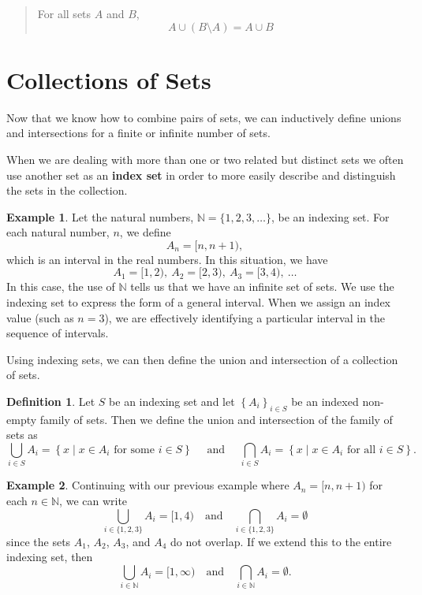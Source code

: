 \documentclass[
]{book}
\theoremstyle{definition}
\newtheorem{definition}{Definition}[chapter]
\theoremstyle{definition}
\newtheorem{example}{Example}[chapter]
\theoremstyle{definition}
\theoremstyle{remark}
\begin{document}
\begin{quote}
For all sets \(A\) and \(B\), \[A \cup (B\setminus A)= A \cup B\]
\end{quote}

\hypertarget{collections-of-sets}{%
\section{Collections of Sets}\label{collections-of-sets}}

Now that we know how to combine pairs of sets, we can inductively define unions and intersections for a finite or infinite number of sets.

When we are dealing with more than one or two related but distinct sets we often use another set as an \textbf{index set} in order to more easily describe and distinguish the sets in the collection.

\begin{example}
\protect\hypertarget{exm:unnamed-chunk-29}{}{\label{exm:unnamed-chunk-29} }Let the natural numbers, \(\mathbb{N}=\{1, 2, 3, \ldots \}\), be an indexing set. For each natural number, \(n\), we define \[A_n = [n,n+1),\] which is an interval in the real numbers. In this situation, we have
\[A_1 = [1,2), \:  A_2 = [2,3), \: A_3 = [3,4),\:  \ldots \]
In this case, the use of \(\mathbb{N}\) tells us that we have an infinite set of sets. We use the indexing set to express the form of a general interval. When we assign an index value (such as \(n=3\)), we are effectively identifying a particular interval in the sequence of intervals.
\end{example}

Using indexing sets, we can then define the union and intersection of a collection of sets.

\begin{definition}
\protect\hypertarget{def:unnamed-chunk-30}{}{\label{def:unnamed-chunk-30} } Let \(S\) be an indexing set and let \(\left\{ A_i\right\}_{i\in S}\) be an indexed non-empty family of sets. Then we define the union and intersection of the family of sets as
\[\bigcup_{i\in S} A_i = \left\{ x \middle \vert x\in A_i \mbox{ for some } i\in S\right\} \quad \mbox{ and } \quad \bigcap_{i\in S} A_i = \left\{ x\middle \vert x\in A_i \mbox{ for all } i \in S\right\}.\]
\end{definition}

\begin{example}
\protect\hypertarget{exm:disjoint}{}{\label{exm:disjoint} }Continuing with our previous example where \(A_n= [n,n+1)\) for each \(n\in \mathbb{N}\), we can write
\[ \bigcup_{i\in \{1,2,3\}} A_i = [1,4) \quad \mbox{and} \quad \bigcap_{i\in \{1,2,3\}} A_i = \emptyset\]
since the sets \(A_1\), \(A_2\), \(A_3\), and \(A_4\) do not overlap. If we extend this to the entire indexing set, then \[\bigcup_{i\in \mathbb{N}} A_i = [1,\infty) \quad \mbox{and} \quad \bigcap_{i\in \mathbb{N}} A_i = \emptyset.\]
\end{example}
\end{document}
